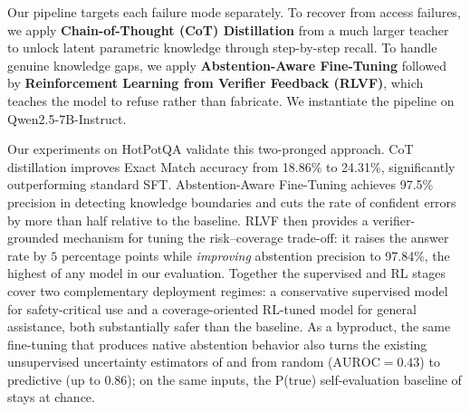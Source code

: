\documentclass[11pt]{article}
\begin{document}
Our pipeline targets each failure mode separately. To recover from access failures, we apply \textbf{Chain-of-Thought (CoT) Distillation} from a much larger teacher to unlock latent parametric knowledge through step-by-step recall. To handle genuine knowledge gaps, we apply \textbf{Abstention-Aware Fine-Tuning} followed by \textbf{Reinforcement Learning from Verifier Feedback (RLVF)}, which teaches the model to refuse rather than fabricate. We instantiate the pipeline on Qwen2.5-7B-Instruct.

Our experiments on HotPotQA validate this two-pronged approach. CoT distillation improves Exact Match accuracy from 18.86\% to 24.31\%, significantly outperforming standard SFT. Abstention-Aware Fine-Tuning achieves 97.5\% precision in detecting knowledge boundaries and cuts the rate of confident errors by more than half relative to the baseline. RLVF then provides a verifier-grounded mechanism for tuning the risk--coverage trade-off: it raises the answer rate by $5$ percentage points while \emph{improving} abstention precision to 97.84\%, the highest of any model in our evaluation. Together the supervised and RL stages cover two complementary deployment regimes: a conservative supervised model for safety-critical use and a coverage-oriented RL-tuned model for general assistance, both substantially safer than the baseline. As a byproduct, the same fine-tuning that produces native abstention behavior also turns the existing unsupervised uncertainty estimators of \citet{vazhentsev2025rauq} and \citet{Farquhar2024Detecting} from random ($\text{AUROC} = 0.43$) to predictive (up to $0.86$); on the same inputs, the P(true) self-evaluation baseline of \citet{kadavath2022language} stays at chance.
\end{document}
